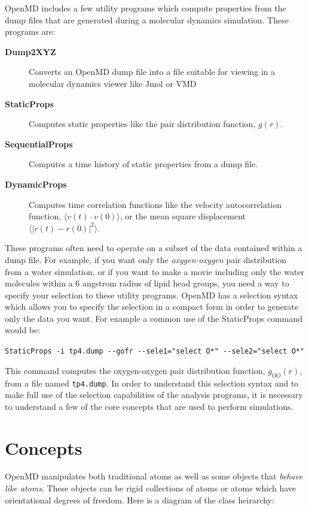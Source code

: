 \documentclass[letterpaper]{report}
\begin{document}
OpenMD includes a few utility programs which compute properties
from the dump files that are generated during a molecular dynamics
simulation.  These programs are:

\begin{description}
\item[{\bf Dump2XYZ}] Converts an OpenMD dump file into a file
suitable for viewing in a molecular dynamics viewer like Jmol or VMD
\item[{\bf StaticProps}] Computes static properties like the pair
distribution function, $g(r)$.
\item[{\bf SequentialProps}] Computes a time history of static
  properties from a dump file.
\item[{\bf DynamicProps}] Computes time correlation functions like the
velocity autocorrelation function, $\langle v(t) \cdot v(0)\rangle$,
or the mean square displacement $\langle |r(t) - r(0)|^{2} \rangle$.
\end{description}

These programs often need to operate on a subset of the data contained
within a dump file.  For example, if you want only the {\it oxygen-oxygen}
pair distribution from a water simulation, or if you want to make a
movie including only the water molecules within a 6 angstrom radius of
lipid head groups, you need a way to specify your selection to these
utility programs.  OpenMD has a selection syntax which allows you to
specify the selection in a compact form in order to generate only the
data you want.  For example a common use of the StaticProps command
would be:

{\tt StaticProps -i tp4.dump -{}-gofr  -{}-sele1="select O*"  -{}-sele2="select O*"}

This command computes the oxygen-oxygen pair distribution function,
$g_{OO}(r)$, from a file named {\tt tp4.dump}.  In order to understand
this selection syntax and to make full use of the selection
capabilities of the analysis programs, it is necessary to understand a
few of the core concepts that are used to perform simulations. 

\section{\label{section:concepts}Concepts}

OpenMD manipulates both traditional atoms as well as some objects that
{\it behave like atoms}.  These objects can be rigid collections of
atoms or atoms which have orientational degrees of freedom.  Here is a
diagram of the class heirarchy:
\end{document}
